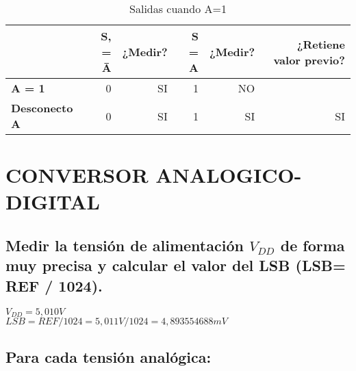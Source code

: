 \begin{table}[H]
	\centering
	\begin{tabular}{l|rr|rrr}
		& \textbf{S, = \={A} } & \textbf{¿Medir?} & \textbf{S = A} & \textbf{¿Medir?} & \textbf{¿Retiene valor previo?}\\
		\midrule
		\textbf{A = 1} & 0     & SI    & 1     & NO \\
		\textbf{Desconecto A} & 0     & SI    & 1     & SI & SI \\
	\end{tabular}%
	\caption{Salidas cuando A=1}
	\label{tab:ejercicio5b-2}%
\end{table}%

\section{CONVERSOR ANALOGICO-DIGITAL}

\subsection{Medir la tensión de alimentación $ V_{DD} $ de forma muy precisa
	y calcular el valor del LSB (LSB= REF / 1024).}
$ V_{DD} = 5,010 V$\\

$ LSB = REF / 1024 = 5,011 V / 1024 = 4,893554688mV$
\subsection{Para cada tensión analógica:}
